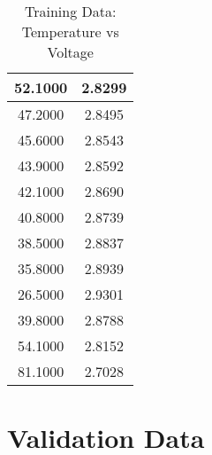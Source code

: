 \documentclass[journal]{IEEEtran}
\begin{document}
\begin{table}[h!]
\begin{tabular}{|c|c|}
52.1000 & 2.8299 \\\hline

47.2000 & 2.8495 \\\hline

45.6000 & 2.8543 \\\hline

43.9000 & 2.8592 \\\hline

42.1000 & 2.8690 \\\hline

40.8000 & 2.8739 \\\hline

38.5000 & 2.8837 \\\hline

35.8000 & 2.8939 \\\hline

26.5000 & 2.9301 \\\hline

39.8000 & 2.8788 \\\hline

54.1000 & 2.8152 \\\hline

81.1000 & 2.7028 \\\hline

\end{tabular}
\caption{Training Data: Temperature vs Voltage}
\label{tab:training_data}
\end{table}

\vspace{1.5cm}

\section*{Validation Data}
\end{document}
